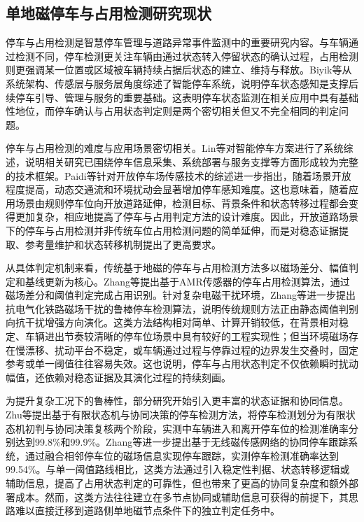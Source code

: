 \documentclass{xdupgthesis}
\begin{document}
\subsection{单地磁停车与占用检测研究现状}
\label{sec:related_parking_detection}

停车与占用检测是智慧停车管理与道路异常事件监测中的重要研究内容。与车辆通过检测不同，停车检测更关注车辆由通过状态转入停留状态的确认过程，占用检测则更强调某一位置或区域被车辆持续占据后状态的建立、维持与释放。Biyik等\cite{ch4_biyik2021smartparking}从系统架构、传感层与服务层角度综述了智能停车系统，说明停车状态感知是支撑后续停车引导、管理与服务的重要基础。这表明停车状态监测在相关应用中具有基础性地位，而停车确认与占用状态判定则是两个密切相关但又不完全相同的判定问题。

停车与占用检测的难度与应用场景密切相关。Lin等\cite{ch4_lin2017surveyparking}对智能停车方案进行了系统综述，说明相关研究已围绕停车信息采集、系统部署与服务支撑等方面形成较为完整的技术框架。Paidi等\cite{R52}针对开放停车场传感技术的综述进一步指出，随着场景开放程度提高，动态交通流和环境扰动会显著增加停车感知难度。这也意味着，随着应用场景由规则停车位向开放道路延伸，检测目标、背景条件和状态转移过程都会变得更加复杂，相应地提高了停车与占用判定方法的设计难度。因此，开放道路场景下的停车与占用检测并非传统车位占用检测问题的简单延伸，而是对稳态证据提取、参考量维护和状态转移机制提出了更高要求。

从具体判定机制来看，传统基于地磁的停车与占用检测方法多以磁场差分、幅值判定和基线更新为核心。Zhang等\cite{ch4_zhang2015amr}提出基于AMR传感器的停车占用检测算法，通过磁场差分和阈值判定完成占用识别。针对复杂电磁干扰环境，Zhang等\cite{ch4_zhang2020railway}进一步提出抗电气化铁路磁场干扰的鲁棒停车检测算法，说明传统规则方法正由静态阈值判别向抗干扰增强方向演化。这类方法结构相对简单、计算开销较低，在背景相对稳定、车辆进出节奏较清晰的停车位场景中具有较好的工程实现性；但当环境磁场存在慢漂移、扰动平台不稳定，或车辆通过过程与停靠过程的边界发生交叠时，固定参考或单一阈值往往容易失效。这也说明，停车与占用状态判定不仅依赖瞬时扰动幅值，还依赖对稳态证据及其演化过程的持续刻画。

为提升复杂工况下的鲁棒性，部分研究开始引入更丰富的状态证据和协同信息。Zhu等\cite{zhu2018parkingfsm}提出基于有限状态机与协同决策的停车检测方法，将停车检测划分为有限状态机初判与协同决策复核两个阶段，实测中车辆进入和离开停车位的检测准确率分别达到99.8\%和99.9\%。Zhang等\cite{ch4_zhang2020tracking}进一步提出基于无线磁传感网络的协同停车跟踪系统，通过融合相邻停车位的磁场信息实现停车跟踪，实测停车检测准确率达到99.54\%。与单一阈值路线相比，这类方法通过引入稳定性判据、状态转移逻辑或辅助信息，提高了占用状态判定的可靠性，但也带来了更高的协同复杂度和额外部署成本。然而，这类方法往往建立在多节点协同或辅助信息可获得的前提下，其思路难以直接迁移到道路侧单地磁节点条件下的独立判定任务中。
\end{document}
